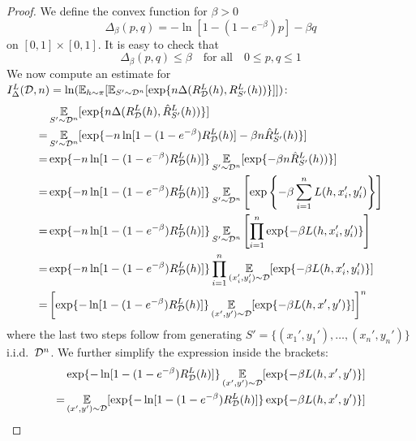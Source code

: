 \begin{proof}
  We define the convex function for $\beta > 0$
  \begin{equation}
    \Delta_\beta(p, q) = -\ln[1 - (1 - e^{-\beta}) p] - \beta q
  \end{equation}
  on $[0, 1] \times [0, 1]$. It is easy to check that
  \begin{equation}
    \Delta_\beta(p, q) \leq \beta \quad \text{for all} \quad 0 \leq p, q \leq 1  
  \end{equation}
  We now compute an estimate for $I_\Delta^L(\mathcal{D}, n) = \ln(\operatorname*{\mathbb{E}}_{h \sim
  \pi}[\operatorname*{\mathbb{E}}_{S' \sim \mathcal{D}^n}[\exp\{n \Delta(R_{\mathcal{D}}^L(h), R_{S'}^L(h))\}]])$:
  \begin{equation}
    \begin{split}
      &\operatorname*{\mathbb{E}}_{S' \sim \mathcal{D}^n}[\exp\{n \Delta(R_{\mathcal{D}}^L(h), \hat{R}_{S'}^L(h))\}] \\
      =& \operatorname*{\mathbb{E}}_{S' \sim \mathcal{D}^n}[\exp\{- n \ln[1 - (1 - e^{-\beta}) R_{\mathcal{D}}^L(h)] -
      \beta n \hat{R}_{S'}^L(h)\}] \\
      =& \exp\{- n \ln[1 - (1 - e^{-\beta}) R_{\mathcal{D}}^L(h)]\} \operatorname*{\mathbb{E}}_{S' \sim
      \mathcal{D}^n}[\exp\{-\beta n \hat{R}_{S'}^L(h))\}] \\
      =& \exp\{- n \ln[1 - (1 - e^{-\beta}) R_{\mathcal{D}}^L(h)]\} \operatorname*{\mathbb{E}}_{S' \sim
      \mathcal{D}^n}\left[\exp\left\{-\beta \sum_{i = 1}^n L(h, x_i',
      y_i')\right\}\right] \\
      =& \exp\{- n \ln[1 - (1 - e^{-\beta}) R_{\mathcal{D}}^L(h)]\} \operatorname*{\mathbb{E}}_{S' \sim
      \mathcal{D}^n}\left[\prod_{i = 1}^n \exp\{-\beta L(h, x_i', y_i')\}\right] \\
      =& \exp\{- n \ln[1 - (1 - e^{-\beta}) R_{\mathcal{D}}^L(h)]\} \prod_{i = 1}^n
      \operatorname*{\mathbb{E}}_{(x_i', y_i') \sim \mathcal{D}}[\exp\{-\beta L(h, x_i', y_i')\}] \\
      =& \left[\exp\{- \ln[1 - (1 - e^{-\beta}) R_{\mathcal{D}}^L(h)]\} \operatorname*{\mathbb{E}}_{(x', y') \sim
      \mathcal{D}}[\exp\{-\beta L(h, x', y')\}]\right]^n
    \end{split}
  \end{equation}
  where the last two steps follow from generating $S' = \{(x_1', y_1'), \ldots,
  (x_n', y_n')\}$ i.i.d.\ $\mathcal{D}^n$. We further simplify the expression inside the
  brackets:
  \begin{equation}
    \begin{split}
      &\exp\{- \ln[1 - (1 - e^{-\beta}) R_\CD^L(h)]\} \Ev_{(x', y') \sim
      \CD}[\exp\{-\beta L(h, x', y')\}] \\
      =& \Ev_{(x', y') \sim \CD}[\exp\{- \ln[1 - (1 - e^{-\beta}) R_\CD^L(h)]\}
      \exp\{-\beta L(h, x', y')\}] \\

\end{split}
\end{equation}
\end{proof}
